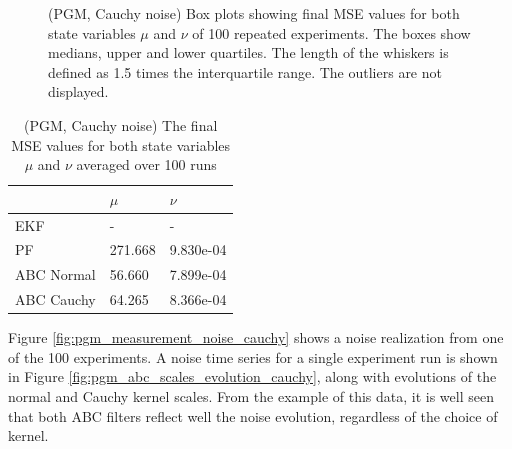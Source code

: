 \begin{figure}[!ht]
\centering
\caption{(PGM, Cauchy noise) Box plots showing final MSE values for both state variables \(\mu\) and \(\nu\) of 100 repeated experiments. The boxes show medians, upper and lower quartiles. The length of the whiskers is defined as 1.5 times the interquartile range. The outliers are not displayed.}
\label{fig:pgm_mse_boxplot_cauchy}
\end{figure}

\begin{table}[h!]
\centering
\begin{tabular}{ |p{4cm}|p{4cm}|p{4cm}|}
 \hline 
  & \(\mu\) & \(\nu\)\\
 \hline \hline
 EKF & - & - \\
 PF & 271.668  & 9.830e-04 \\
 ABC Normal & 56.660 & 7.899e-04\\
 ABC Cauchy & 64.265 & 8.366e-04\\
 \hline
\end{tabular}
\caption{(PGM, Cauchy noise) The final MSE values for both state variables \(\mu\) and \(\nu\) averaged over 100 runs}
\label{table:pgm_mse_cauchy}
\end{table}

Figure \ref{fig:pgm_measurement_noise_cauchy} shows a noise realization from one of the 100 experiments. A noise time series for a single experiment run is shown in Figure \ref{fig:pgm_abc_scales_evolution_cauchy}, along with evolutions of the normal and Cauchy kernel scales. From the example of this data, it is well seen that both ABC filters reflect well the noise evolution, regardless of the choice of kernel.

